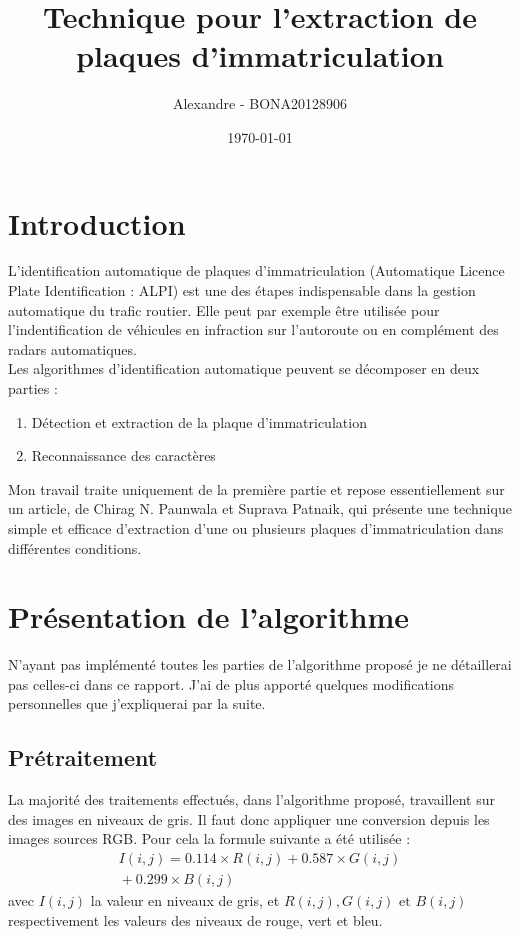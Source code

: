 \documentclass[a4paper,10pt,twocolumn]{article}
\title{\huge \textbf{Technique pour l'extraction de plaques d'immatriculation}}
\author{Alexandre \bsc{Bonhomme} - \small{BONA20128906}}
\date{\today}
\begin{document}
\maketitle

\section{Introduction}
L'identification automatique de plaques d'immatriculation (Automatique Licence Plate Identification : ALPI) est une des étapes indispensable dans la gestion automatique du trafic routier. Elle peut par exemple être utilisée pour l'indentification de véhicules en infraction sur l'autoroute ou en complément des radars automatiques.\\
Les algorithmes d'identification automatique peuvent se décomposer en deux parties : 
\begin{enumerate}
  \item Détection et extraction de la plaque d'immatriculation
  \item Reconnaissance des caractères
\end{enumerate}
Mon travail traite uniquement de la première partie et repose essentiellement sur un article, de Chirag N. Paunwala et Suprava Patnaik\cite{paunwala10}, qui présente une technique simple et efficace d'extraction d'une ou plusieurs plaques d'immatriculation dans différentes conditions.

\section{Présentation de l'algorithme}
N'ayant pas implémenté toutes les parties de l'algorithme proposé je ne détaillerai pas celles-ci dans ce rapport. J'ai de plus apporté quelques modifications personnelles que j'expliquerai par la suite.

\subsection{Prétraitement}
La majorité des traitements effectués, dans l'algorithme proposé, travaillent sur des images en niveaux de gris. Il faut donc appliquer une conversion depuis les images sources RGB. Pour cela la formule suivante a été utilisée :
\begin{gather}
  I(i, j) = 0.114\times R(i, j) + 0.587\times G(i, j) {} \\ {} + 0.299\times B(i, j)\nonumber
\end{gather}
avec $I(i,j)$ la valeur en niveaux de gris, et $R(i,j), G(i,j) \text{ et } B(i,j)$ respectivement les valeurs des niveaux de rouge, vert et bleu.
\end{document}
